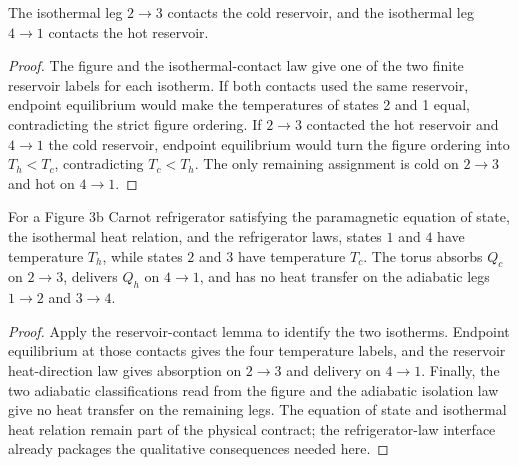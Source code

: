 \begin{lemma}
  \label{lem:physics:IPhO_2026_3_C_1:aux022}
  The isothermal leg \(2\to3\) contacts the cold reservoir, and the
  isothermal leg \(4\to1\) contacts the hot reservoir.
\end{lemma}
\begin{proof}
  The figure and the isothermal-contact law give one of the two finite
  reservoir labels for each isotherm.  If both contacts used the same
  reservoir, endpoint equilibrium would make the temperatures of states 2
  and 1 equal, contradicting the strict figure ordering.  If \(2\to3\)
  contacted the hot reservoir and \(4\to1\) the cold reservoir, endpoint
  equilibrium would turn the figure ordering into \(T_h<T_c\), contradicting
  \(T_c<T_h\).  The only remaining assignment is cold on \(2\to3\) and hot
  on \(4\to1\).
\end{proof}

\begin{theorem}
  \label{thm:physics:IPhO_2026_3_C_1}
  For a Figure 3b Carnot refrigerator satisfying the paramagnetic equation
  of state, the isothermal heat relation, and the refrigerator laws, states
  \(1\) and \(4\) have temperature \(T_h\), while states \(2\) and \(3\)
  have temperature \(T_c\).  The torus absorbs \(Q_c\) on \(2\to3\),
  delivers \(Q_h\) on \(4\to1\), and has no heat transfer on the adiabatic
  legs \(1\to2\) and \(3\to4\).
\end{theorem}
\begin{proof}
  Apply the reservoir-contact lemma to identify the two isotherms.  Endpoint
  equilibrium at those contacts gives the four temperature labels, and the
  reservoir heat-direction law gives absorption on \(2\to3\) and delivery
  on \(4\to1\).  Finally, the two adiabatic classifications read from the
  figure and the adiabatic isolation law give no heat transfer on the
  remaining legs.  The equation of state and isothermal heat relation remain
  part of the physical contract; the refrigerator-law interface already
  packages the qualitative consequences needed here.
\end{proof}
